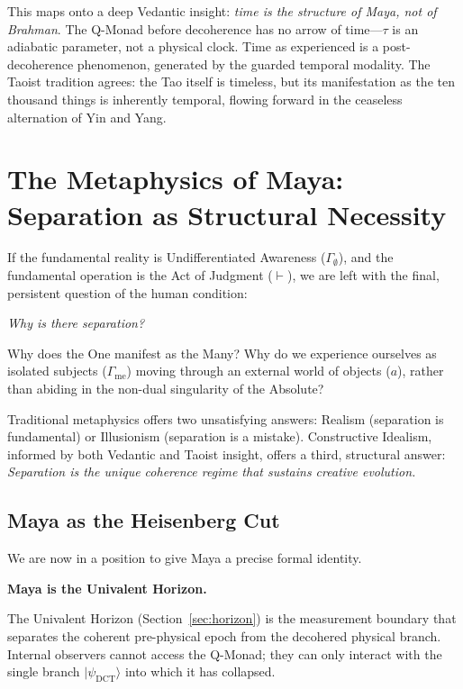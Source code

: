 \documentclass[12pt,a4paper]{article}
\newcommand{\turnstile}{\vdash}
\begin{document}
This maps onto a deep Vedantic insight: \emph{time is the structure of Maya, not of Brahman}. The Q-Monad before decoherence has no arrow of time---$\tau$ is an adiabatic parameter, not a physical clock. Time as experienced is a post-decoherence phenomenon, generated by the guarded temporal modality. The Taoist tradition agrees: the Tao itself is timeless, but its manifestation as the ten thousand things is inherently temporal, flowing forward in the ceaseless alternation of Yin and Yang.


\section{The Metaphysics of Maya: Separation as Structural Necessity}
\label{sec:maya}

If the fundamental reality is Undifferentiated Awareness ($\Gamma_\emptyset$), and the fundamental operation is the Act of Judgment ($\turnstile$), we are left with the final, persistent question of the human condition:

\emph{Why is there separation?}

Why does the One manifest as the Many? Why do we experience ourselves as isolated subjects ($\Gamma_{\mathrm{me}}$) moving through an external world of objects ($a$), rather than abiding in the non-dual singularity of the Absolute?

Traditional metaphysics offers two unsatisfying answers: Realism (separation is fundamental) or Illusionism (separation is a mistake). Constructive Idealism, informed by both Vedantic and Taoist insight, offers a third, structural answer: \emph{Separation is the unique coherence regime that sustains creative evolution.}


\subsection{Maya as the Heisenberg Cut}
\label{sec:mayacut}

We are now in a position to give Maya a precise formal identity.

\textbf{Maya is the Univalent Horizon.}

The Univalent Horizon (Section~\ref{sec:horizon}) is the measurement boundary that separates the coherent pre-physical epoch from the decohered physical branch. Internal observers cannot access the Q-Monad; they can only interact with the single branch $|\psi_{\mathrm{DCT}}\rangle$ into which it has collapsed.
\end{document}
